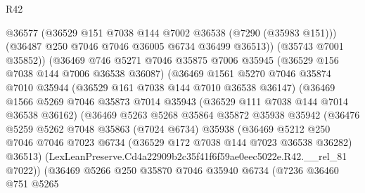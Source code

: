 \begin{lexlean}{R42}
\begin{coremodule}
{                          @36577
                          (@36529 @151 @7038 @144 @7002 @36538 (@7290 (@35983 @151)))
                          (@36487 @250 @7046 @7046 @36005 @6734 @36499 @36513))
                        (@35743 @7001 @35852))
                      (@36469
                        @746
                        @5271
                        @7046
                        @35875
                        @7006
                        @35945
                        (@36529 @156 @7038 @144 @7006 @36538 @36087)
                        (@36469
                          @1561
                          @5270
                          @7046
                          @35874
                          @7010
                          @35944
                          (@36529 @161 @7038 @144 @7010 @36538 @36147)
                          (@36469
                            @1566
                            @5269
                            @7046
                            @35873
                            @7014
                            @35943
                            (@36529 @111 @7038 @144 @7014 @36538 @36162)
                            (@36469
                              @5263
                              @5268
                              @35864
                              @35872
                              @35938
                              @35942
                              (@36476
                                @5259
                                @5262
                                @7048
                                @35863
                                (@7024 @6734)
                                @35938
                                (@36469
                                  @5212
                                  @250
                                  @7046
                                  @7046
                                  @7023
                                  @6734
                                  (@36529 @172 @7038 @144 @7023 @36538 @36282)
                                  @36513)
                                (LexLeanPreserve.Cd4a22909b2c35f41f6f59ae0eec5022e.R42.__rel_81
                                  @7022))
                              (@36469
                                @5266
                                @250
                                @35870
                                @7046
                                @35940
                                @6734
                                (@7236
                                  @36460
                                  @751
                                  @5265
}
\end{coremodule}
\end{lexlean}
